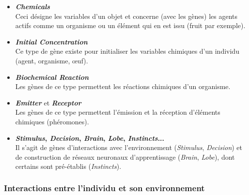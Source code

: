 \documentclass[11pt,twoside,a4paper]{article}
\begin{document}
\begin{itemize}
	\item \textbf{\emph{Chemicals}}~\\
Ceci d{\'e}signe les variables d'un objet et concerne (avec les g{\`e}nes) les agents actifs comme un organisme ou un {\'e}l{\'e}ment qui en est issu (fruit par exemple). 
	\item \textbf{\emph{Initial Concentration}}~\\
Ce type de g{\`e}ne existe pour initialiser les variables chimiques d'un individu (agent, organisme, \oe uf). 
	\item \textbf{\emph{Biochemical Reaction}}~\\
Les g{\`e}nes de ce type permettent les r{\'e}actions chimiques d'un organisme. 
	\item \textbf{\emph{Emitter}} et \textbf{\emph{Receptor}}~\\
Les g{\`e}nes de ce type permettent l'{\'e}mission et la r{\'e}ception d'{\'e}l{\'e}ments chimiques (ph{\'e}romones). 
	\item \textbf{\emph{Stimulus}, \emph{Decision}, \emph{Brain}, \emph{Lobe}, \emph{Instincts}...}~\\
Il s'agit de g{\`e}nes d'interactions avec l'environnement (\emph{Stimulus}, \emph{Decision}) et de construction de r{\'e}seaux neuronaux d'apprentissage (\emph{Brain}, \emph{Lobe}), dont certains sont pr{\'e}-{\'e}tablis (\emph{Instincts}). 
\end{itemize}

\subsubsection{Interactions entre l'individu et son environnement}
\end{document}

